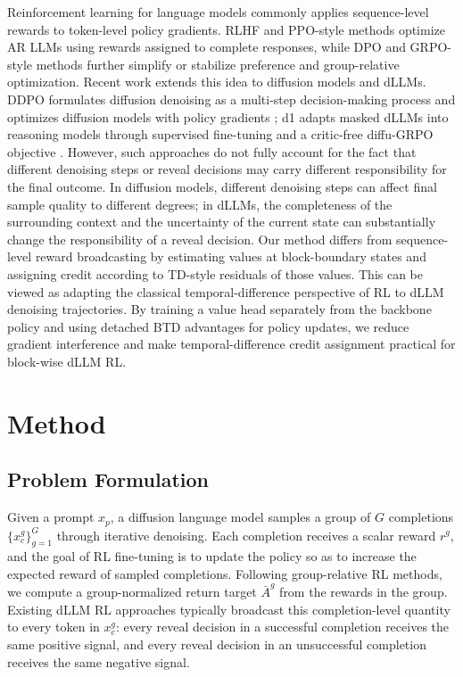 \documentclass[letterpaper]{article}
\begin{document}
Reinforcement learning for language models commonly applies sequence-level rewards to token-level policy gradients. RLHF and PPO-style methods optimize AR LLMs using rewards assigned to complete responses, while DPO and GRPO-style methods further simplify or stabilize preference and group-relative optimization. Recent work extends this idea to diffusion models and dLLMs. DDPO formulates diffusion denoising as a multi-step decision-making process and optimizes diffusion models with policy gradients \cite{black2023ddpo}; d1 adapts masked dLLMs into reasoning models through supervised fine-tuning and a critic-free diffu-GRPO objective \cite{zhao2025d1}. However, such approaches do not fully account for the fact that different denoising steps or reveal decisions may carry different responsibility for the final outcome. In diffusion models, different denoising steps can affect final sample quality to different degrees; in dLLMs, the completeness of the surrounding context and the uncertainty of the current state can substantially change the responsibility of a reveal decision. Our method differs from sequence-level reward broadcasting by estimating values at block-boundary states and assigning credit according to TD-style residuals of those values. This can be viewed as adapting the classical temporal-difference perspective of RL to dLLM denoising trajectories. By training a value head separately from the backbone policy and using detached BTD advantages for policy updates, we reduce gradient interference and make temporal-difference credit assignment practical for block-wise dLLM RL.

\section{Method}
\label{sec:method}

\subsection{Problem Formulation}

Given a prompt $x_p$, a diffusion language model samples a group of $G$ completions $\{x_c^g\}_{g=1}^{G}$ through iterative denoising. Each completion receives a scalar reward $r^g$, and the goal of RL fine-tuning is to update the policy so as to increase the expected reward of sampled completions. Following group-relative RL methods, we compute a group-normalized return target $\bar{A}^g$ from the rewards in the group. Existing dLLM RL approaches typically broadcast this completion-level quantity to every token in $x_c^g$: every reveal decision in a successful completion receives the same positive signal, and every reveal decision in an unsuccessful completion receives the same negative signal.
\end{document}
